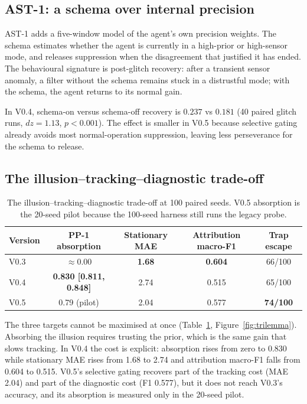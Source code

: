 \documentclass{article}
\begin{document}
\subsection{AST-1: a schema over internal precision}

AST-1 adds a five-window model of the agent's own precision weights. The schema estimates whether the agent is currently in a high-prior or high-sensor mode, and releases suppression when the disagreement that justified it has ended. The behavioural signature is post-glitch recovery: after a transient sensor anomaly, a filter without the schema remains stuck in a distrustful mode; with the schema, the agent returns to its normal gain.

In V0.4, schema-on versus schema-off recovery is $\mathbf{0.237}$ vs $\mathbf{0.181}$ (40 paired glitch runs, $dz=1.13$, $p<0.001$). The effect is smaller in V0.5 because selective gating already avoids most normal-operation suppression, leaving less perseverance for the schema to release.

\subsection{The illusion--tracking--diagnostic trade-off}

\begin{table}[t]
\centering
\small
\caption{The illusion--tracking--diagnostic trade-off at 100 paired seeds. V0.5 absorption is the 20-seed pilot because the 100-seed harness still runs the legacy probe.}
\label{tab:trilemma}
\begin{tabular}{lcccc}
\toprule
Version & PP-1 absorption & Stationary MAE & Attribution macro-F1 & Trap escape \\
\midrule
V0.3 & $\approx 0.00$ & \textbf{1.68} & \textbf{0.604} & 66/100 \\
V0.4 & \textbf{0.830 [0.811, 0.848]} & 2.74 & 0.515 & 65/100 \\
V0.5 & 0.79 (pilot) & 2.04 & 0.577 & \textbf{74/100} \\
\bottomrule
\end{tabular}
\end{table}

The three targets cannot be maximised at once (Table~\ref{tab:trilemma}, Figure~\ref{fig:trilemma}). Absorbing the illusion requires trusting the prior, which is the same gain that slows tracking. In V0.4 the cost is explicit: absorption rises from zero to 0.830 while stationary MAE rises from 1.68 to 2.74 and attribution macro-F1 falls from 0.604 to 0.515. V0.5's selective gating recovers part of the tracking cost (MAE 2.04) and part of the diagnostic cost (F1 0.577), but it does not reach V0.3's accuracy, and its absorption is measured only in the 20-seed pilot.
\end{document}
